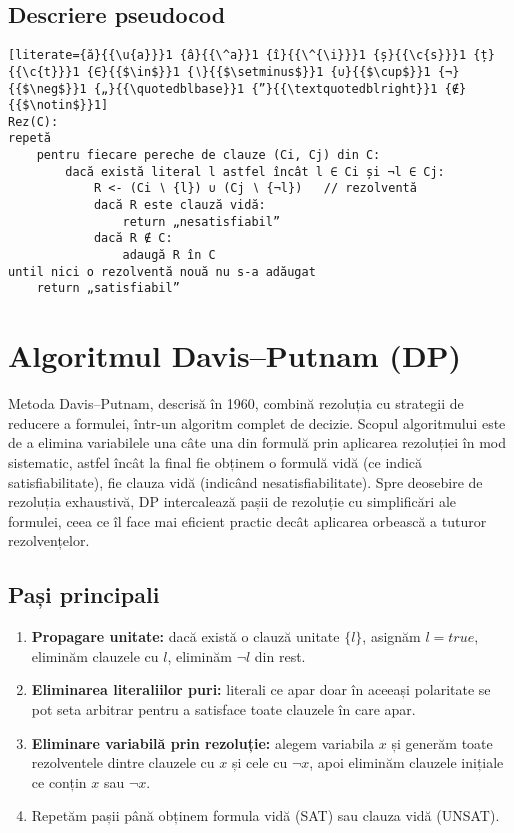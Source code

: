 \documentclass[12pt]{article}
\begin{document}
\subsection{Descriere pseudocod}
\begin{lstlisting}[literate={ă}{{\u{a}}}1 {â}{{\^a}}1 {î}{{\^{\i}}}1 {ș}{{\c{s}}}1 {ț}{{\c{t}}}1 {∈}{{$\in$}}1 {∖}{{$\setminus$}}1 {∪}{{$\cup$}}1 {¬}{{$\neg$}}1 {„}{{\quotedblbase}}1 {”}{{\textquotedblright}}1 {∉}{{$\notin$}}1]
Rez(C):
repetă
    pentru fiecare pereche de clauze (Ci, Cj) din C:
        dacă există literal l astfel încât l ∈ Ci și ¬l ∈ Cj:
            R <- (Ci ∖ {l}) ∪ (Cj ∖ {¬l})   // rezolventă
            dacă R este clauză vidă:
                return „nesatisfiabil”
            dacă R ∉ C:
                adaugă R în C
until nici o rezolventă nouă nu s-a adăugat
    return „satisfiabil”
\end{lstlisting}

\section{Algoritmul Davis--Putnam (DP)}
Metoda Davis–Putnam, descrisă în 1960, combină rezoluția cu strategii de reducere a formulei, într-un algoritm complet de decizie. Scopul algoritmului este de a elimina variabilele una câte una din formulă prin aplicarea rezoluției în mod sistematic, astfel încât la final fie obținem o formulă vidă (ce indică satisfiabilitate), fie clauza vidă (indicând nesatisfiabilitate). \cite{davis-putnam1960} Spre deosebire de rezoluția exhaustivă, DP intercalează pașii de rezoluție cu simplificări ale formulei, ceea ce îl face mai eficient practic decât aplicarea orbească a tuturor rezolvențelor.
\subsection{Pași principali}
\begin{enumerate}
  \item \textbf{Propagare unitate:} dacă există o clauză unitate $\{l\}$, asignăm $l=true$, eliminăm clauzele cu $l$, eliminăm $\neg l$ din rest.
  \item \textbf{Eliminarea literaliilor puri:} literali ce apar doar în aceeași polaritate se pot seta arbitrar pentru a satisface toate clauzele în care apar.
  \item \textbf{Eliminare variabilă prin rezoluție:} alegem variabila $x$ și generăm toate rezolventele dintre clauzele cu $x$ și cele cu $\neg x$, apoi eliminăm clauzele inițiale ce conțin $x$ sau $\neg x$.
  \item Repetăm pașii până obținem formula vidă (SAT) sau clauza vidă (UNSAT).
\end{enumerate}
\end{document}
